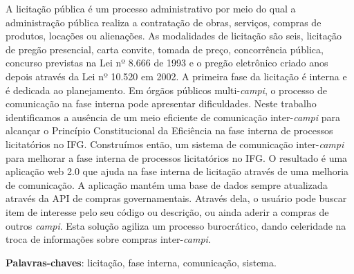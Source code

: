 \begin{resumo}
 A licitação pública é um processo administrativo por meio do qual a administração pública realiza a contratação de obras, serviços, compras de produtos, locações ou alienações.
 As modalidades de licitação são seis, licitação de pregão presencial, carta convite, tomada de preço, concorrência pública, concurso previstas na Lei nº 8.666 de 1993 e o pregão eletrônico criado anos depois através da Lei nº 10.520 em 2002.
 A primeira fase da licitação é interna e é dedicada ao planejamento.
 Em órgãos públicos multi-\textit{campi}, o processo de comunicação na fase interna pode apresentar dificuldades.
 Neste trabalho identificamos a ausência de um meio eficiente de comunicação inter-\textit{campi} para alcançar o Princípio Constitucional da Eficiência na fase interna de processos licitatórios no IFG.
 Construímos então, um sistema de comunicação inter-\textit{campi} para melhorar a fase interna de processos licitatórios no IFG.
 O resultado é uma aplicação web 2.0 que ajuda na fase interna de licitação através de uma melhoria de comunicação.
 A aplicação mantém uma base de dados sempre atualizada através da API de compras governamentais.
 Através dela, o usuário pode buscar item de interesse pelo seu código ou descrição, ou ainda aderir a compras de outros \textit{campi}.
 Esta solução agiliza um processo burocrático, dando celeridade na troca de informações sobre compras inter-\textit{campi}.
 \vspace{\onelineskip}
    
 \noindent
 \textbf{Palavras-chaves}: licitação, fase interna, comunicação, sistema.
\end{resumo}
